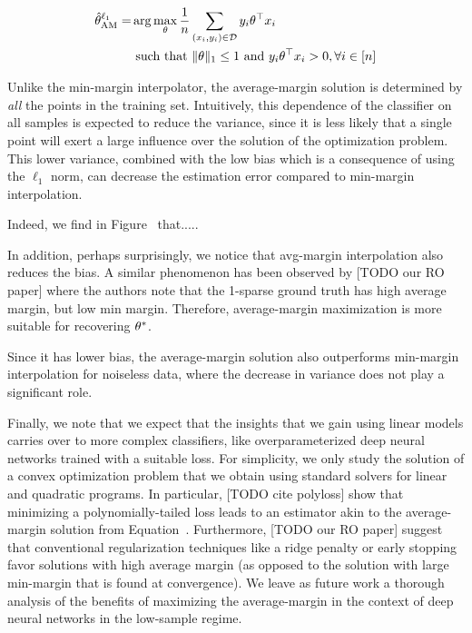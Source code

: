 \begin{align}
  \hat{\theta}^{\ell_1}_{\mathrm{AM}} =& \arg\max_{\theta} \frac{1}{n} \sum_{(x_i, y_i) \in \mathcal{D}} y_i\theta^\top x_i \\
  &\text{ such that }
  \|\theta\|_1 \le 1 \text{ and } y_i\theta^\top x_i > 0, \forall i \in [n]
\end{align}

Unlike the min-margin interpolator, the average-margin solution is determined
by \emph{all} the points in the training set. Intuitively, this dependence of
the classifier on all samples is expected to reduce the variance, since it is
less likely that a single point will exert a large influence over the solution
of the optimization problem. This lower variance, combined with the low bias
which is a consequence of using the $\ell_1$ norm, can decrease the estimation
error compared to min-margin interpolation.

Indeed, we find in Figure~ that.....



In addition, perhaps surprisingly, we notice that avg-margin interpolation also
reduces the bias. A similar phenomenon has been observed by [TODO our RO paper]
where the authors note that the 1-sparse ground truth has high average margin,
but low min margin. Therefore, average-margin maximization is more suitable for
recovering $\theta^*$.

Since it has lower bias, the average-margin solution also outperforms min-margin
interpolation for noiseless data, where the decrease in variance does not play a
significant role. 

Finally, we note that we expect that the insights that we gain using linear
models carries over to more complex classifiers, like overparameterized deep
neural networks trained with a suitable loss. For simplicity, we only study the
solution of a convex optimization problem that we obtain using standard solvers
for linear and quadratic programs. In particular, [TODO cite polyloss] show that
minimizing a polynomially-tailed loss leads to an estimator akin to the
average-margin solution from Equation~. Furthermore, [TODO our RO
paper] suggest that conventional regularization techniques like a ridge penalty
or early stopping favor solutions with high average margin (as opposed to the
solution with large min-margin that is found at convergence).  We leave as
future work a thorough analysis of the benefits of maximizing the average-margin
in the context of deep neural networks in the low-sample regime.

